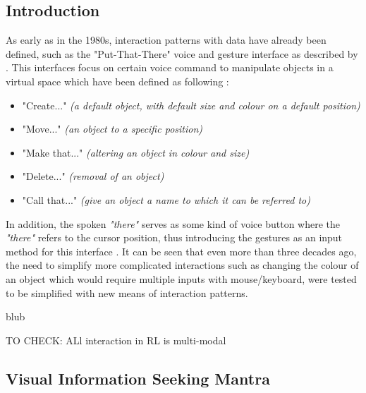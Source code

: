 
\subsection{Introduction}

As early as in the 1980s, interaction patterns with data have already been defined, such as the "Put-That-There" voice and gesture interface as described by \cite{Bolt1980}. This interfaces focus on certain voice command to manipulate objects in a virtual space which have been defined as following \citep{Bolt1980}:
\begin{itemize}[noitemsep,nolistsep]
	\item "Create..." \textit{(a default object, with default size and colour on a default position)}
	\item "Move..." \textit{(an object to a specific position)}
	\item "Make that..." \textit{(altering an object in colour and size)}
	\item "Delete..." \textit{(removal of an object)}
	\item "Call that..." \textit{(give an object a name to which it can be referred to)}
\end{itemize}
In addition, the spoken \textit{"there"} serves as some kind of voice button where the \textit{"there"} refers to the cursor position, thus introducing the gestures as an input method for this interface \citep{Bolt1980}. \newline
It can be seen that even more than three decades ago, the need to simplify more complicated interactions such as changing the colour of an object which would require multiple inputs with mouse/keyboard, were tested to be simplified with new means of interaction patterns.


blub



TO CHECK: ALl interaction in RL is multi-modal \citep{Bunt1998}


\subsection{Visual Information Seeking Mantra}


\cite{Stauffer2016}



